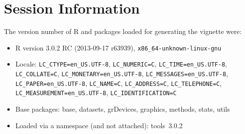 \documentclass[11pt,a4paper]{article}
\begin{document}
\clearpage

\section*{Session Information}

The version number of R and packages loaded for generating the vignette were:


\begin{itemize}\raggedright
  \item R version 3.0.2 RC (2013-09-17 r63939), \verb|x86_64-unknown-linux-gnu|
  \item Locale: \verb|LC_CTYPE=en_US.UTF-8|, \verb|LC_NUMERIC=C|, \verb|LC_TIME=en_US.UTF-8|, \verb|LC_COLLATE=C|, \verb|LC_MONETARY=en_US.UTF-8|, \verb|LC_MESSAGES=en_US.UTF-8|, \verb|LC_PAPER=en_US.UTF-8|, \verb|LC_NAME=C|, \verb|LC_ADDRESS=C|, \verb|LC_TELEPHONE=C|, \verb|LC_MEASUREMENT=en_US.UTF-8|, \verb|LC_IDENTIFICATION=C|
  \item Base packages: base, datasets, grDevices, graphics, methods,
    stats, utils
  \item Loaded via a namespace (and not attached): tools~3.0.2
\end{itemize}
\end{document}
